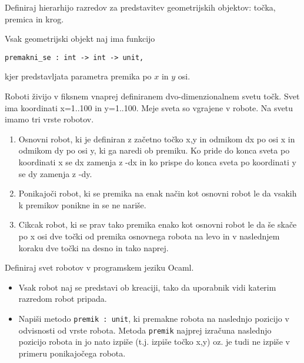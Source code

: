 \begin{ex}
Definiraj hierarhijo razredov za predstavitev geometrijskih objektov: to\v cka, premica in krog. 

Vsak geometrijski objekt naj ima funkcijo
\begin{lstlisting}
premakni_se : int -> int -> unit,
\end{lstlisting}
kjer predstavljata parametra premika po $x$ in $y$ osi. 
\end{ex}






\begin{ex}
Roboti \v zivijo v fiksnem vnaprej definiranem dvo-dimenzionalnem svetu to\v ck. Svet ima koordinati x=1..100 in y=1..100. Meje sveta so vgrajene v robote. Na svetu imamo tri vrste robotov.

\begin{enumerate}
\item Osnovni robot, ki je definiran z za\v cetno to\v cko x,y in odmikom dx po osi x in odmikom dy po osi y, ki ga naredi ob premiku. Ko pride do konca sveta po koordinati x se dx zamenja z -dx in ko prispe do konca sveta po koordinati y se dy zamenja z -dy.

\item Ponikajo\v ci robot, ki se premika na enak na\v cin kot osnovni robot le da vsakih k premikov ponikne in se ne nari\v se.

\item Cikcak robot, ki se prav tako premika enako kot osnovni robot le da \v se ska\v ce po x osi dve to\v cki od premika osnovnega robota na levo in v naslednjem koraku dve to\v cki na desno in tako naprej.
\end{enumerate}

Definiraj svet robotov v programskem jeziku Ocaml. 
\begin{itemize}
\item Vsak robot naj se predstavi ob kreaciji, tako da uporabnik vidi katerim razredom robot pripada.

\item Napi\v si metodo \lstinline{premik : unit}, ki premakne robota na naslednjo pozicijo v odvisnosti od vrste robota. Metoda \texttt{premik} najprej izra\v cuna naslednjo pozicijo robota in jo nato izpi\v se (t.j. izpi\v se to\v cko x,y) oz. je tudi ne izpi\v se v primeru ponikajo\v cega robota.
\end{itemize}
\end{ex}





